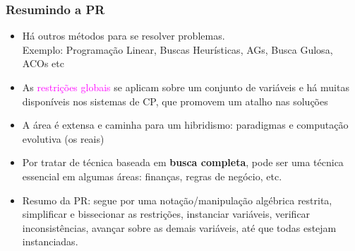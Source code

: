 \documentclass{beamer}
\begin{document}





\begin{frame}[fragile]
\frametitle{Resumindo a PR}

\begin{itemize}
  \item Há outros métodos para se resolver problemas.\\
  Exemplo: Programação Linear, Buscas Heurísticas, AGs, Busca Gulosa, ACOs  etc

  \pause  
  \item As \textcolor{magenta}{restrições globais} se aplicam sobre um conjunto de variáveis
  e há muitas disponíveis nos sistemas de CP, que promovem um atalho nas soluções

  \pause
  \item A área é extensa e caminha para um hibridismo: paradigmas e computação evolutiva (os reais)
  
  \pause
  \item Por tratar de técnica baseada em {\bf busca completa}, pode ser uma técnica essencial em algumas áreas: finanças, regras de negócio, etc. 

  \pause
  \item Resumo da PR: segue por uma notação/manipulação algébrica restrita,
        simplificar e bissecionar as restrições, instanciar variáveis, 
        verificar inconsistências,   avançar sobre as demais variáveis, até que todas 
        estejam instanciadas.
  

\end{itemize}
\end{frame}
\end{document}
